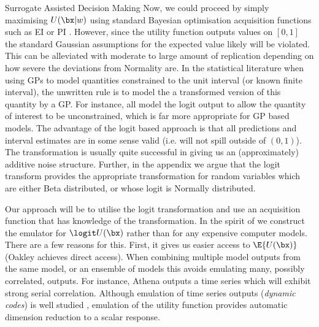 \begin{chapter}{Surrogate Assisted Decision Making \label{Chap:optimisation}}
Now, we could proceed by simply maximising $U(\bx|w)$ using standard Bayesian optimisation acquisition functions such as EI or PI \citep{Shahriari2015}. However, since the utility function outputs values on $[0,1]$ the standard Gaussian assumptions for the expected value likely will be violated. This can be alleviated with moderate to large amount of replication depending on how severe the deviations from Normality are.
In the statistical literature when using GPs to model quantities constrained to the unit interval (or known finite interval), the unwritten rule is to model the a transformed version of this quantity by a GP. For instance, \citet{Henderson09, Boys2018,Baker2020c} all model the logit output to allow the quantity of interest to be unconstrained, which is far more appropriate for GP based models. The advantage of the logit based approach is that all predictions and interval estimates are in some sense valid (i.e. will not spill outside of $(0,1)$). The transformation is usually quite successful in giving us an (approximately) additive noise structure. Further, in the appendix we argue that the logit transform provides the appropriate transformation for random variables which are either Beta distributed, or whose logit is Normally distributed. %

Our approach will be to utilise the logit transformation and use an acquisition function that has knowledge of the transformation. In the spirit of \citet{Oakley2009} we construct the emulator for $\logit U(\bx)$ rather than for any expensive computer models. There are a few reasons for this. First, it gives us easier access to $\E \{ U(\bx) \}$ (Oakley achieves direct access). When combining multiple model outputs from the same model, or an ensemble of models this avoids emulating many, possibly correlated, outputs. For instance, Athena outputs a time series which will exhibit strong serial correlation. Although emulation of time series outputs (\textit{dynamic codes}) is well studied \citep{Conti2009, Conti2010, oyebamiji2017}, emulation of the utility function provides automatic dimension reduction to a scalar response.


\end{chapter}
